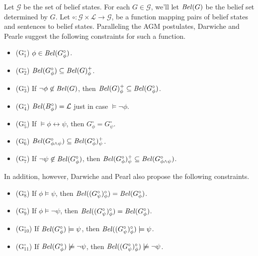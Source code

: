 Let $\mathcal{G}$ be the set of belief states.
For each $G \in \mathcal{G}$, we'll let $\text{\textit{Bel}}(G)$ be the belief set determined by $G$.
Let $\circ: \mathcal{G} \times \mathcal{L} \rightarrow \mathcal{G}$, be a function mapping pairs of belief states and sentences to belief states.
Paralleling the AGM postulates, Darwiche and Pearle suggest the following constraints for such a function.
\begin{itemize}
\item[](G$^\circ_1$) \quad $\phi \in \text{\textit{Bel}}(G^\circ_\phi)$.
\item[](G$^\circ_2$) \quad $\text{\textit{Bel}}(G^\circ_\phi) \subseteq \text{\textit{Bel}}(G)^+_\phi$.
\item[](G$^\circ_3$) \quad If $\lnot \phi \not \in \text{\textit{Bel}}(G)$, then $\text{\textit{Bel}}(G)^+_\phi \subseteq \text{\textit{Bel}}(G^\circ_\phi)$.
\item[](G$^\circ_4$) \quad $\text{\textit{Bel}}(B^\circ_\phi) = \mathcal{L}$ just in case $ \models \lnot \phi$.
\item[](G$^\circ_5$) \quad If $\models \phi \leftrightarrow \psi$, then $G^\circ_\phi = G^\circ_\psi$.
\item[](G$^\circ_6$) \quad $\text{\textit{Bel}}(G^\circ_{\phi \wedge \psi}) \subseteq \text{\textit{Bel}}(G^\circ_\phi)^+_\psi$.
\item[](G$^\circ_7$) \quad If $\lnot \psi \not \in \text{\textit{Bel}}(G^\circ_\phi)$, then $\text{\textit{Bel}}(G^\circ_\phi)^+_\psi \subseteq \text{\textit{Bel}}(G^\circ_{\phi \wedge \psi})$.
\end{itemize}
In addition, however, Darwiche and Pearl also propose the following constraints.
\begin{itemize}
\item[](G$^\circ_8$) \quad If $\phi \models \psi$, then $\text{\textit{Bel}}((G^\circ_\psi)^\circ_\phi) = \text{\textit{Bel}}(G^\circ_\phi)$.
\item[](G$^\circ_9$) \quad If $\phi \models \lnot \psi$, then $\text{\textit{Bel}}((G^\circ_\psi)^\circ_\phi) = \text{\textit{Bel}}(G^\circ_\phi)$.
\item[](G$^\circ_{10}$) \quad If $\text{\textit{Bel}}(G^\circ_\phi) \models \psi$, then $\text{\textit{Bel}}((G^\circ_\psi)^\circ_\phi) \models \psi$.
\item[](G$^\circ_{11}$) \quad If  $\text{\textit{Bel}}(G^\circ_\phi) \not \models \lnot \psi$, then $\text{\textit{Bel}}((G^\circ_\psi)^\circ_\phi) \not \models \lnot \psi$.
\end{itemize}


